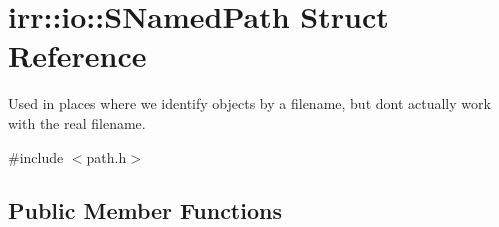 \hypertarget{structirr_1_1io_1_1SNamedPath}{}\section{irr\+:\+:io\+:\+:S\+Named\+Path Struct Reference}
\label{structirr_1_1io_1_1SNamedPath}


Used in places where we identify objects by a filename, but don\textquotesingle{}t actually work with the real filename.  




{\ttfamily \#include $<$path.\+h$>$}

\subsection*{Public Member Functions}
